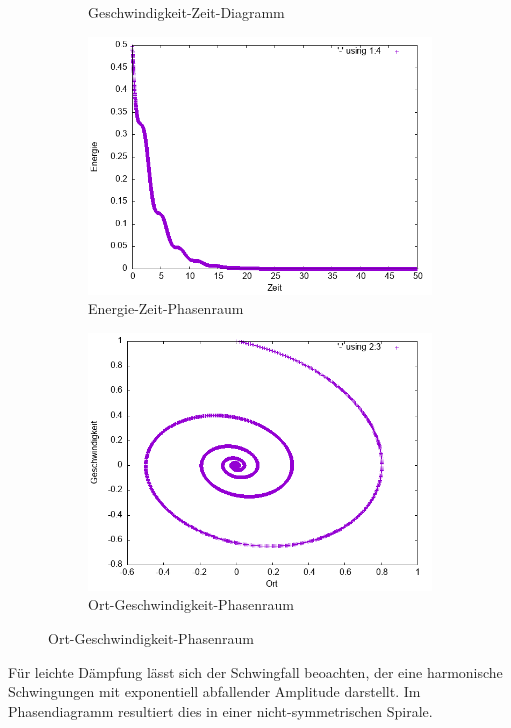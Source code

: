 \documentclass[
    oneside,
    ngerman,
    footinclude=false,
    captions=tableheading,
    DIV=12
]{scrartcl}
\begin{document}
\begin{figure}[H]
\begin{subfigure}[b]{0.45\textwidth}
                        \caption{Geschwindigkeit-Zeit-Diagramm}
                        \label{fig:VVA1(a)-001-0.3-v}
                    \end{subfigure}
                    \hfill
                    \begin{subfigure}[b]{0.45\textwidth}
                        \centering
                        \includegraphics[width=\textwidth]{Bilddateien/VVA1(b)-001-0.3-E.png}
                        \caption{Energie-Zeit-Phasenraum}
                        \label{fig:VVA1(a)-001-0.3-E}
                    \end{subfigure}
                    \begin{subfigure}[b]{0.45\textwidth}
                        \centering
                        \includegraphics[width=\textwidth]{Bilddateien/VVA1(b)-001-0.3-xv.png}
                        \caption{Ort-Geschwindigkeit-Phasenraum}
                        \label{fig:VVA1(a)-001-0.3-xv}
                    \end{subfigure}
                \end{figure}
                Für leichte Dämpfung lässt sich der Schwingfall beoachten, der eine harmonische Schwingungen mit exponentiell abfallender Amplitude darstellt. Im Phasendiagramm resultiert dies in einer nicht-symmetrischen Spirale.
                \newpage
\end{document}
